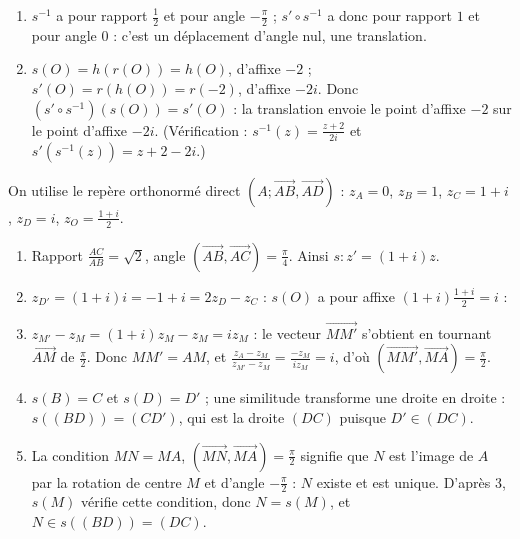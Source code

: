 \begin{corrige}
\begin{sol}
\begin{enumerate}
\begin{enumerate}
                  \item $s^{-1}$ a pour rapport $\frac12$ et pour angle $-\frac{\pi}{2}$ ; $s' \circ s^{-1}$ a donc pour rapport $1$ et pour angle $0$ :
                        c'est un déplacement d'angle nul, une translation.
                  \item $s(O) = h(r(O)) = h(O)$, d'affixe $-2$ ; $s'(O) = r(h(O)) = r(-2)$, d'affixe $-2i$.
                        Donc $(s' \circ s^{-1})(s(O)) = s'(O)$ : la translation envoie le point d'affixe $-2$ sur le point d'affixe $-2i$.
                        (Vérification : $s^{-1}(z) = \frac{z+2}{2i}$ et $s'(s^{-1}(z)) = z + 2 - 2i$.)
            \end{enumerate}
\end{enumerate}
\end{sol}
\begin{sol}
On utilise le repère orthonormé direct $(A;\overrightarrow{AB},\overrightarrow{AD})$ : $z_A = 0$, $z_B = 1$, $z_C = 1 + i$, $z_D = i$, $z_O = \frac{1+i}{2}$.
\begin{enumerate}
      \item Rapport $\frac{AC}{AB} = \sqrt2$, angle $(\overrightarrow{AB},\overrightarrow{AC}) = \frac{\pi}{4}$. Ainsi $s : z' = (1+i)z$.
      \item $z_{D'} = (1+i)i = -1 + i = 2z_D - z_C$ : 
            $s(O)$ a pour affixe $(1+i)\frac{1+i}{2} = i$ : 
      \item $z_{M'} - z_M = (1+i)z_M - z_M = i z_M$ : le vecteur $\overrightarrow{MM'}$ s'obtient en tournant $\overrightarrow{AM}$ de $\frac{\pi}{2}$.
            Donc $MM' = AM$, et $\frac{z_A - z_M}{z_{M'} - z_M} = \frac{-z_M}{iz_M} = i$, d'où $(\overrightarrow{MM'},\overrightarrow{MA}) = \frac{\pi}{2}$.
      \item $s(B) = C$ et $s(D) = D'$ ; une similitude transforme une droite en droite : $s((BD)) = (CD')$, qui est la droite $(DC)$
            puisque $D' \in (DC)$.
      \item La condition $MN = MA$, $(\overrightarrow{MN},\overrightarrow{MA}) = \frac{\pi}{2}$ signifie que $N$ est l'image de $A$ par la rotation de centre $M$ et d'angle $-\frac{\pi}{2}$ :
            $N$ existe et est unique. D'après 3, $s(M)$ vérifie cette condition, donc $N = s(M)$, et $N \in s((BD)) = (DC)$.

\end{enumerate}
\end{sol}
\end{corrige}
